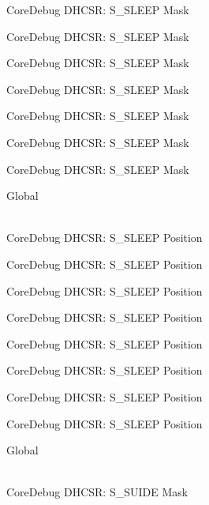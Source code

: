 \begin{DoxyRefList}
\label{deprecated__deprecated000116}%
%
Core\+Debug DHCSR\+: S\+\_\+\+SLEEP Mask 

\label{deprecated__deprecated000170}%
%
Core\+Debug DHCSR\+: S\+\_\+\+SLEEP Mask 

\label{deprecated__deprecated000255}%
%
Core\+Debug DHCSR\+: S\+\_\+\+SLEEP Mask 

\label{deprecated__deprecated000312}%
%
Core\+Debug DHCSR\+: S\+\_\+\+SLEEP Mask 

\label{deprecated__deprecated000388}%
%
Core\+Debug DHCSR\+: S\+\_\+\+SLEEP Mask 

\label{deprecated__deprecated000475}%
%
Core\+Debug DHCSR\+: S\+\_\+\+SLEEP Mask 

\label{deprecated__deprecated000577}%
%
Core\+Debug DHCSR\+: S\+\_\+\+SLEEP Mask  
\item[{\parbox[t]{\linewidth}{Global \doxylink{group___c_m_s_i_s___core_debug_ga349ccea33accc705595624c2d334fbcb}{Core\+Debug\+\_\+\+DHCSR\+\_\+\+S\+\_\+\+SLEEP\+\_\+\+Pos} }}]\hfill \\
\label{deprecated__deprecated000023}%
%
Core\+Debug DHCSR\+: S\+\_\+\+SLEEP Position 

\label{deprecated__deprecated000115}%
%
Core\+Debug DHCSR\+: S\+\_\+\+SLEEP Position 

\label{deprecated__deprecated000169}%
%
Core\+Debug DHCSR\+: S\+\_\+\+SLEEP Position 

\label{deprecated__deprecated000254}%
%
Core\+Debug DHCSR\+: S\+\_\+\+SLEEP Position 

\label{deprecated__deprecated000311}%
%
Core\+Debug DHCSR\+: S\+\_\+\+SLEEP Position 

\label{deprecated__deprecated000387}%
%
Core\+Debug DHCSR\+: S\+\_\+\+SLEEP Position 

\label{deprecated__deprecated000474}%
%
Core\+Debug DHCSR\+: S\+\_\+\+SLEEP Position 

\label{deprecated__deprecated000576}%
%
Core\+Debug DHCSR\+: S\+\_\+\+SLEEP Position  
\item[{\parbox[t]{\linewidth}{Global \doxylink{group___c_m_s_i_s___s_c_b_gad37656791dbb216ffb194995f28c412c}{Core\+Debug\+\_\+\+DHCSR\+\_\+\+S\+\_\+\+SUIDE\+\_\+\+Msk} }}]\hfill \\
\label{deprecated__deprecated000016}%
%
Core\+Debug DHCSR\+: S\+\_\+\+SUIDE Mask 


\end{DoxyRefList}
